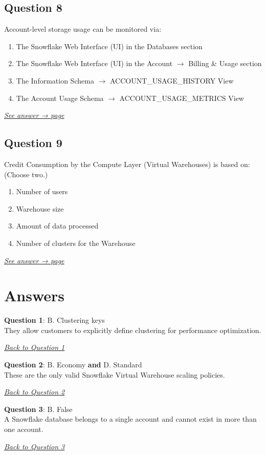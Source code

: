 \documentclass[12pt]{article}
\newcommand{\seeanswer}[1]{%
  \par\smallskip\emph{\hyperref[ans:#1]{See answer → page \pageref{ans:#1}}}%
}
\newcommand{\answer}[2]{%
  \textbf{Question #1}\label{ans:#1}: #2\par
  \smallskip\emph{\hyperref[q:#1]{Back to Question #1}}\par\medskip
}
\begin{document}
\subsection*{Question 8}\label{q:8}
Account-level storage usage can be monitored via:

\begin{enumerate}[label=\Alph*.]
  \item The Snowflake Web Interface (UI) in the Databases section
  \item The Snowflake Web Interface (UI) in the Account $\rightarrow$ Billing \& Usage section
  \item The Information Schema $\rightarrow$ ACCOUNT\_USAGE\_HISTORY View
  \item The Account Usage Schema $\rightarrow$ ACCOUNT\_USAGE\_METRICS View
\end{enumerate}
\seeanswer{8}

\subsection*{Question 9}\label{q:9}
Credit Consumption by the Compute Layer (Virtual Warehouses) is based on: (Choose two.)

\begin{enumerate}[label=\Alph*.]
  \item Number of users
  \item Warehouse size
  \item Amount of data processed
  \item Number of clusters for the Warehouse
\end{enumerate}
\seeanswer{9}
\newpage
\section*{Answers}

\answer{1}{B. Clustering keys\\
They allow customers to explicitly define clustering for performance optimization.}

\answer{2}{B. Economy \textbf{and} D. Standard\\
These are the only valid Snowflake Virtual Warehouse scaling policies.}

\answer{3}{B. False\\
A Snowflake database belongs to a single account and cannot exist in more than one account.}
\end{document}
